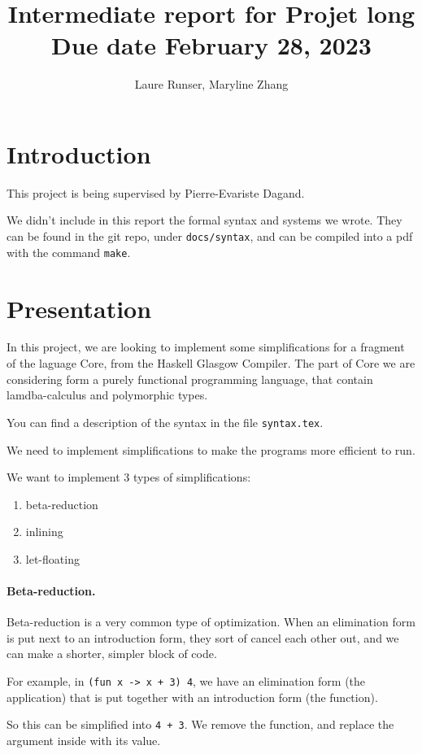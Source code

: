 \documentclass{article}
\title{Intermediate report for Projet long\\ Due date February 28, 2023}
\author{Laure Runser, Maryline Zhang}
\begin{document}
\maketitle


\section{Introduction}
This project is being supervised by Pierre-Evariste Dagand.


We didn't include in this report the formal syntax and systems we wrote.
They can be found in the git repo, under {\tt docs/syntax}, and
can be compiled into a pdf with the command {\tt make}.

\section{Presentation}
In this project, we are looking to implement some simplifications for a fragment of 
the laguage Core, from the Haskell Glasgow Compiler. The part of Core we are 
considering form a purely functional programming language, that contain 
lamdba-calculus and polymorphic types.

You can find a description of the syntax in the file {\tt syntax.tex}.

We need to implement simplifications to make the programs more efficient to run.

We want to implement 3 types of simplifications:
\begin{enumerate}
  \item beta-reduction 
  \item inlining 
  \item let-floating
\end{enumerate}

\paragraph{Beta-reduction.}Beta-reduction is a very common type of optimization.
When an elimination form is put next to an introduction form, they sort of cancel 
each other out, and we can make a shorter, simpler block of code.

For example, in {\tt (fun x -> x + 3) 4}, we have an elimination form (the application)
that is put together with an introduction form (the function).

So this can be simplified into {\tt 4 + 3}. We remove the function, and replace the argument
inside with its value.
\end{document}
